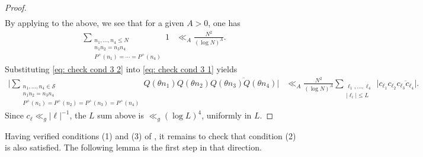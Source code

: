 \documentclass[12pt]{amsart}
\renewcommand{\leq}{\leqslant}
\numberwithin{equation}{section}
\theoremstyle{plain}
\theoremstyle{definition}
\renewcommand{\l}{\ell}
\newcommand{\CS}{\mathcal{S}}
\begin{document}
\begin{proof}
\begin{align*}
		\end{align*}
		By applying  to the above, we see that for a given $A > 0$, one has
		\begin{align}\label{eq: check cond 3 2}
			\sum_{\substack{n_1,\dots,n_4 \leq N  \\ n_1n_2=n_3n_4 \\ P^+(n_1)=\cdots= P^+(n_4)}}1 &\ll_A  \frac{N^2}{(\log N)^A}.
		\end{align}
		Substituting \eqref{eq: check cond 3 2} into \eqref{eq: check cond 3 1} yields
		\begin{align}
			\bigg|\sum_{\substack{n_1,\dots,n_4 \in \CS \\ n_1n_2=n_3n_4 \\ P^+(n_1)=P^+(n_2) = P^+(n_3) = P^+(n_4)}}Q(\theta n_1)Q(\theta n_2)\overline{Q(\theta n_3)Q(\theta n_4)}\bigg| &\ll_A \frac{N^2}{(\log N)^A}\sum_{\substack{\l_1,\dots,\l_4 \\ |\l_i| \leq L}} \big|c_{\l_1}c_{\l_2}\overline{c_{\l_3}c_{\l_4}}\big|.
		\end{align}
		Since $c_\ell \ll_g |\l|^{-1}$, the $L$ sum above is $\ll_g (\log L)^4$, uniformly in $L$.
	\end{proof}
	Having verified conditions (1) and (3) of , it remains to check that condition (2) is also satisfied. The following lemma is the first step in that direction. 
	
\end{document}
